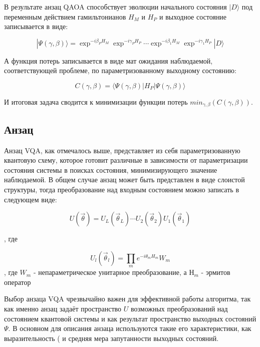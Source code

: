 \documentclass[12pt]{extarticle}
\begin{document}
\qquad В результате анзац QAOA способствует эволюции начального состояния $|D \rangle $ под переменным действием гамильтонианов $H_{M}$ и $H_{P}$ и выходное состояние записывается в виде: 

\begin{equation}
| \Psi(\gamma, \beta) \rangle =  \exp^{-i \beta_P H_M} \exp^{-i \gamma_P H_P} \cdots \exp^{-i \beta_1 H_M} \exp^{-i \gamma_1 H_P}|D \rangle
\end{equation} 

\qquad А функция потерь записывается в виде мат ожидания наблюдаемой, соответствующей проблеме, по параметризованному выходному состоянию:

\begin{equation}
C(\gamma, \beta) = \langle \Psi(\gamma, \beta)  | H_{P} | \Psi(\gamma, \beta) \rangle
\end{equation} 

\qquad И итоговая задача сводится к минимизации функции потерь $ min_{\gamma, \beta} (C(\gamma, \beta))$.


\qquad  

\subsection{Анзац}

\qquad Анзац VQA, как отмечалось выше, представляет из себя параметризованную квантовую схему, которое готовит различные в зависимости от параметризации состояния системы в поисках состояния, минимизирующего значение наблюдаемой. В общем случае анзац может быть представлен в виде слоистой структуры, тогда преобразование над входным состоянием можно записать в следующем виде:

\begin{equation}
U(\vec \theta) = U_{L}(\vec \theta_{L}) \cdots U_{2}(\vec \theta_{2}) U_{1}(\vec \theta_{1})
\end{equation}

, где 

\begin{equation}
U_{l}(\vec \theta_{l}) = \prod_{m} e^{-i \theta_{m} H_{m} } W_{m}
\end{equation} , где $W_{m}$ - непараметрическое унитарное преобразование, а $Н_{m}$ - эрмитов оператор



\qquad Выбор анзаца VQA чрезвычайно важен для эффективной работы алгоритма, так как именно анзац задаёт пространство $U$ возможных преобразований над состоянием квантовой системы и как результат пространство выходных состояний $\Psi$. В основном для описания анзаца используются такие его характеристики, как выразительность ( и средняя мера запутанности выходных состояний.
\end{document}
